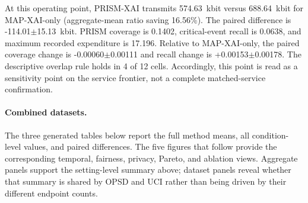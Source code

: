 At this operating point, PRISM-XAI transmits 574.63~kbit versus 688.64~kbit for MAP-XAI-only (aggregate-mean ratio saving 16.56\%). The paired difference is -114.01$\pm$15.13~kbit. PRISM coverage is 0.1402, critical-event recall is 0.0638, and maximum recorded expenditure is 17.196. Relative to MAP-XAI-only, the paired coverage change is -0.00060$\pm$0.00111 and recall change is +0.00153$\pm$0.00178. The descriptive overlap rule holds in 4 of 12 cells. Accordingly, this point is read as a sensitivity point on the service frontier, not a complete matched-service confirmation.

\paragraph{Combined datasets.} The three generated tables below report the full method means, all condition-level values, and paired differences. The five figures that follow provide the corresponding temporal, fairness, privacy, Pareto, and ablation views. Aggregate panels support the setting-level summary above; dataset panels reveal whether that summary is shared by OPSD and UCI rather than being driven by their different endpoint counts.

\begin{table}[p]\centering\tiny

\caption{Public-score threshold $\tau=1$, release cap $M=32$, Combined datasets: complete generated method table.}

\label{tab:thr_1_cap_32:combined:main}

\resizebox{\linewidth}{!}{}

\end{table}\clearpage

\begin{table}[p]\centering\tiny

\caption{Public-score threshold $\tau=1$, release cap $M=32$, Combined datasets: complete condition-level generated table.}

\label{tab:thr_1_cap_32:combined:conditions}

\resizebox{\textwidth}{!}{}

\end{table}\clearpage

\begin{table}[p]\centering\tiny

\caption{Public-score threshold $\tau=1$, release cap $M=32$, Combined datasets: complete generated paired comparisons.}

\label{tab:thr_1_cap_32:combined:paired}

\resizebox{\textwidth}{!}{}

\end{table}\clearpage

